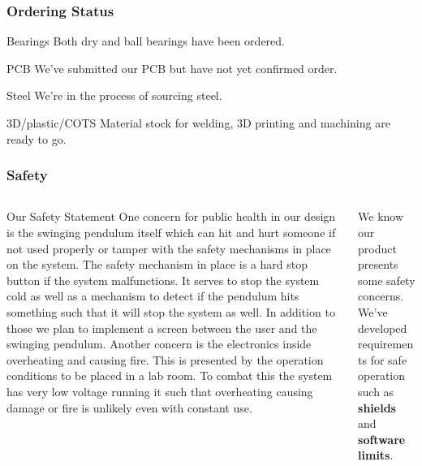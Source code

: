 \documentclass[aspectratio=169]{beamer}
\begin{document}
\begin{frame}
    \frametitle{Ordering Status}

    \begin{block}{Bearings}
        Both dry and ball bearings have been ordered.
    \end{block}

    \begin{block}{PCB}
        We've submitted our PCB but have not yet confirmed order.
    \end{block}

    \begin{block}{Steel}
        We're in the process of sourcing steel.
    \end{block}

    \begin{block}{3D/plastic/COTS}
        Material stock for welding, 3D printing and machining are ready to go.
    \end{block}
\end{frame}


\begin{frame}
    \frametitle{Safety}

    \begin{columns}
        \begin{column}{0.75\textwidth}
            \begin{block}{Our Safety Statement}
                One concern for public health in our design is the swinging pendulum itself which can hit and hurt someone if not used properly or tamper with the safety mechanisms in place on the system. The safety mechanism in place is a hard stop button if the system malfunctions. It serves to stop the system cold as well as a mechanism to detect if the pendulum hits something such that it will stop the system as well. In addition to those we plan to implement a screen between the user and the swinging pendulum. Another concern is the electronics inside overheating and causing fire. This is presented by the operation conditions to be placed in a lab room. To combat this the system has very low voltage running it such that overheating causing damage or fire is unlikely even with constant use.
            \end{block}
        \end{column}

        \begin{column}{0.20\textwidth}
            We know our product presents some safety concerns. We've developed
            requirements for safe operation such as \textbf{shields} and
            \textbf{software limits}.
        \end{column}
    \end{columns}

\end{frame}
\end{document}
